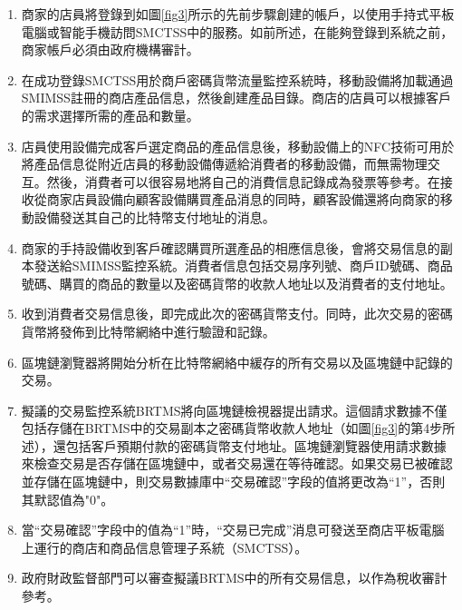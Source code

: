 		\begin{enumerate}
			\item 商家的店員將登錄到如圖\ref{fig3}所示的先前步驟創建的帳戶，以使用手持式平板電腦或智能手機訪問SMCTSS中的服務。如前所述，在能夠登錄到系統之前，商家帳戶必須由政府機構審計。
			\item 在成功登錄SMCTSS用於商戶密碼貨幣流量監控系統時，移動設備將加載通過SMIMSS註冊的商店產品信息，然後創建產品目錄。商店的店員可以根據客戶的需求選擇所需的產品和數量。
			\item 店員使用設備完成客戶選定商品的產品信息後，移動設備上的NFC技術可用於將產品信息從附近店員的移動設備傳遞給消費者的移動設備，而無需物理交互。然後，消費者可以很容易地將自己的消費信息記錄成為發票等參考。在接收從商家店員設備向顧客設備購買產品消息的同時，顧客設備還將向商家的移動設備發送其自己的比特幣支付地址的消息。
			\item 商家的手持設備收到客戶確認購買所選產品的相應信息後，會將交易信息的副本發送給SMIMSS監控系統。消費者信息包括交易序列號、商戶ID號碼、商品號碼、購買的商品的數量以及密碼貨幣的收款人地址以及消費者的支付地址。
			\item 收到消費者交易信息後，即完成此次的密碼貨幣支付。同時，此次交易的密碼貨幣將發佈到比特幣網絡中進行驗證和記錄。
			\item 區塊鏈瀏覽器將開始分析在比特幣網絡中緩存的所有交易以及區塊鏈中記錄的交易。
			\item 擬議的交易監控系統BRTMS將向區塊鏈檢視器提出請求。這個請求數據不僅包括存儲在BRTMS中的交易副本之密碼貨幣收款人地址（如圖\ref{fig3}的第4步所述），還包括客戶預期付款的密碼貨幣支付地址。區塊鏈瀏覽器使用請求數據來檢查交易是否存儲在區塊鏈中，或者交易還在等待確認。如果交易已被確認並存儲在區塊鏈中，則交易數據庫中“交易確認”字段的值將更改為“1”，否則其默認值為"0"。
			\item 當“交易確認”字段中的值為“1”時，“交易已完成”消息可發送至商店平板電腦上運行的商店和商品信息管理子系統（SMCTSS）。
			\item 政府財政監督部門可以審查擬議BRTMS中的所有交易信息，以作為稅收審計參考。
		\end{enumerate}
